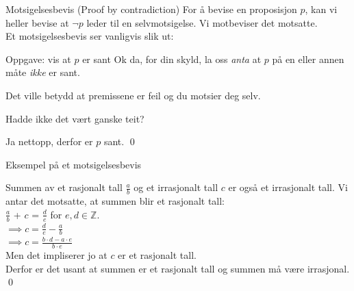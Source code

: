 \begin{frame}{Motsigelsesbevis (Proof by contradiction)}
    For å bevise en proposisjon $p$, kan vi heller bevise at $\lnot p$ leder til en selvmotsigelse. 
    Vi motbeviser det motsatte.\\

    \pause
    Et motsigelsesbevis ser vanligvis slik ut:
    \begin{block}{Oppgave: vis at $p$ er sant}
        \pause
        Ok da, for din skyld, la oss \emph{anta} at $p$ på en eller annen måte \emph{ikke} er sant.

        \pause Det ville betydd at premissene er feil og du motsier deg selv.

        \pause
        Hadde ikke det vært ganske teit?

        \pause
        Ja nettopp, derfor er $p$ sant. \qed
    \end{block}
\end{frame}

\begin{frame}{Eksempel på et motsigelsesbevis}
    \begin{block}{Summen av et rasjonalt tall $\frac{a}{b}$ og et irrasjonalt tall $c$ er også et irrasjonalt tall.}
        \pause
        Vi antar det motsatte, at summen blir et rasjonalt tall: \\
        \pause
        $\frac{a}{b}$ + $c$ = $\frac{d}{e}$ for $e, d \in \mathbb{Z}$.\\
        \pause
        $\implies c = \frac{d}{e} - \frac{a}{b}$\\
        \pause
        $\implies c = \frac{b\cdot d - a \cdot e}{b\cdot e}$\\[1.5mm]
        \pause
        Men det impliserer jo at $c$ er et rasjonalt tall. \pause \text{\Lightning}\\
        \pause
        Derfor er det usant at summen er et rasjonalt tall og summen må være irrasjonal.
        \qed
    \end{block}
\end{frame}

